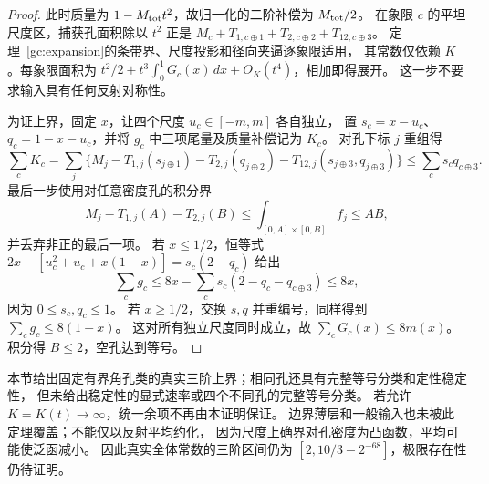 \begin{proof}
此时质量为 $1-M_{\rm tot}t^2$，故归一化的二阶补偿为 $M_{\rm tot}/2$。
在象限 $c$ 的平坦尺度区，捕获孔面积除以 $t^2$ 正是
$M_c+T_{1,c\oplus1}+T_{2,c\oplus2}+T_{12,c\oplus3}$。
定理~\ref{gc:expansion}的条带界、尺度投影和径向夹逼逐象限适用，
其常数仅依赖 $K$。每象限面积为
$t^2/2+t^3\int_0^1G_c(x)\,dx+O_K(t^4)$，相加即得展开。
这一步不要求输入具有任何反射对称性。

为证上界，固定 $x$，让四个尺度 $u_c\in[-m,m]$ 各自独立，
置 $s_c=x-u_c$、$q_c=1-x-u_c$，并将 $g_c$ 中三项尾量及质量补偿记为 $K_c$。
对孔下标 $j$ 重组得
\[
 \sum_cK_c=\sum_j\{M_j-T_{1,j}(s_{j\oplus1})-T_{2,j}(q_{j\oplus2})
 -T_{12,j}(s_{j\oplus3},q_{j\oplus3})\}
 \le\sum_cs_cq_{c\oplus3}.
\]
最后一步使用对任意密度孔的积分界
\[
 M_j-T_{1,j}(A)-T_{2,j}(B)\le\int_{[0,A]\times[0,B]}f_j\le AB,
\]
并丢弃非正的最后一项。
若 $x\le1/2$，恒等式
$2x-[u_c^2+u_c+x(1-x)]=s_c(2-q_c)$ 给出
\[
 \sum_cg_c\le8x-\sum_cs_c(2-q_c-q_{c\oplus3})\le8x,
\]
因为 $0\le s_c,q_c\le1$。
若 $x\ge1/2$，交换 $s,q$ 并重编号，同样得到
$\sum_cg_c\le8(1-x)$。
这对所有独立尺度同时成立，故 $\sum_cG_c(x)\le8m(x)$。
积分得 $B\le2$，空孔达到等号。
\end{proof}

\begin{remark}\label{gc:scope}
本节给出固定有界角孔类的真实三阶上界；相同孔还具有完整等号分类和定性稳定性，
但未给出稳定性的显式速率或四个不同孔的完整等号分类。
若允许 $K=K(t)\to\infty$，统一余项不再由本证明保证。
边界薄层和一般输入也未被此定理覆盖；不能仅以反射平均约化，
因为尺度上确界对孔密度为凸函数，平均可能使泛函减小。
因此真实全体常数的三阶区间仍为 $[2,10/3-2^{-68}]$，极限存在性仍待证明。
\end{remark}

